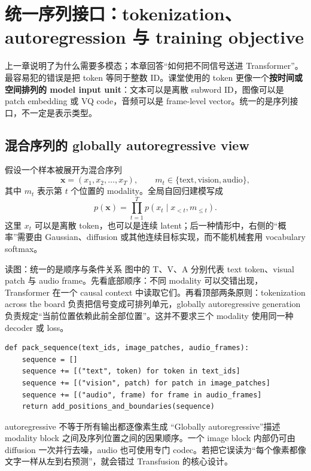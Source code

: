 \section{统一序列接口：tokenization、autoregression 与 training objective}

上一章说明了为什么需要多模态；本章回答“如何把不同信号送进 Transformer”。最容易犯的错误是把 token 等同于整数 ID。课堂使用的 token 更像一个\textbf{按时间或空间排列的 model input unit}：文本可以是离散 subword ID，图像可以是 patch embedding 或 VQ code，音频可以是 frame-level vector。统一的是序列接口，不一定是表示类型。

\subsection{混合序列的 globally autoregressive view}

假设一个样本被展开为混合序列
$$
\mathbf{x}=(x_1,x_2,\ldots,x_T),\qquad m_t\in\{\text{text},\text{vision},\text{audio}\},
$$
其中 $m_t$ 表示第 $t$ 个位置的 modality。全局自回归建模写成
$$
p(\mathbf{x})=\prod_{t=1}^{T}p\!\left(x_t\mid x_{<t},m_{\le t}\right).
$$
这里 $x_t$ 可以是离散 token，也可以是连续 latent；后一种情形中，右侧的“概率”需要由 Gaussian、diffusion 或其他连续目标实现，而不能机械套用 vocabulary softmax。


\begin{knowledgebox}{读图：统一的是顺序与条件关系}
图中的 T、V、A 分别代表 text token、visual patch 与 audio frame。先看底部顺序：不同 modality 可以交错出现，Transformer 在一个 causal context 中读取它们。再看顶部两条原则：tokenization across the board 负责把信号变成可排列单元，globally autoregressive generation 负责规定“当前位置依赖此前全部位置”。这并不要求三个 modality 使用同一种 decoder 或 loss。
\end{knowledgebox}

\begin{lstlisting}[caption={将多模态样本打包成一个带 modality 标签的序列}]
def pack_sequence(text_ids, image_patches, audio_frames):
    sequence = []
    sequence += [("text", token) for token in text_ids]
    sequence += [("vision", patch) for patch in image_patches]
    sequence += [("audio", frame) for frame in audio_frames]
    return add_positions_and_boundaries(sequence)
\end{lstlisting}

\begin{warningbox}{autoregressive 不等于所有输出都逐像素生成}
“Globally autoregressive”描述 modality block 之间及序列位置之间的因果顺序。一个 image block 内部仍可由 diffusion 一次并行去噪，audio 也可使用专门 codec。若把它误读为“每个像素都像文字一样从左到右预测”，就会错过 Transfusion 的核心设计。
\end{warningbox}

